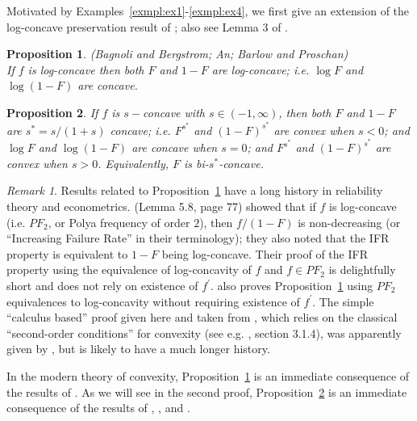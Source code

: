 \documentclass[11pt]{amsart}
\numberwithin{equation}{section}
\theoremstyle{definition}\newtheorem{definition}{Definition}
\theoremstyle{remark}\newtheorem{assumption}{Assumption}
\theoremstyle{remark}\newtheorem{remark}{Remark}
\theoremstyle{definition}\newtheorem{example}{Example}
\theoremstyle{plain}\newtheorem{question}{Question}
\theoremstyle{plain}\newtheorem{theorem}{Theorem}
\theoremstyle{plain}\newtheorem{lemma}{Lemma}
\theoremstyle{plain}\newtheorem{proposition}{Proposition}
\theoremstyle{plain}\newtheorem{corollary}{Corollary}
\theoremstyle{plain}\newtheorem{conjecture}{Conjecture}
\begin{document}
Motivated by Examples~\ref{exmpl:ex1}-\ref{exmpl:ex4}, 
we first give an extension of the log-concave preservation result of 
\cite{MR2213177}; 
also see Lemma 3 of  \cite{MR1637480}.
\smallskip
 
\begin{proposition}
\label{prop:BagnoliBergstrom} 
(Bagnoli and Bergstrom;  An;  Barlow and Proschan)\\
If $f$ is log-concave then both $F$ and $1-F$ are log-concave; i.e. $\log F$ and $\log (1-F)$ 
are concave.
\end{proposition}

\begin{proposition}
\label{prop:1s}  
If $f$ is $s-$concave with $s \in (-1,\infty)$, 
then both $F $ and $1-F$ are $ s^* = s/(1+s)$ concave; 
i.e. $F^{s^*} $ and $(1-F)^{s^*}$ are convex when $s<0$; and $\log F $ and $\log (1-F)$ are concave
when $s=0$; and  $F^{s^*} $ and $(1-F)^{s^*}$ are convex when $s>0$.  Equivalently, $F$ is bi-$s^*$-concave.
\end{proposition}
  
\begin{remark}
\label{rem:1}
Results related to Proposition~\ref{prop:BagnoliBergstrom} have a long history in reliability theory and econometrics.
\cite{MR0438625} (Lemma 5.8, page 77) showed that if $f$ is log-concave (i.e. $PF_2$, or Polya frequency of order $2$), 
then $f/(1-F)$ is non-decreasing (or ``Increasing Failure Rate'' in their terminology);   they also noted that 
the IFR property is equivalent to $1-F$ being log-concave.  Their proof of the IFR property using the equivalence 
of log-concavity of $f$ and $f \in PF_2$ is delightfully short and does not rely on existence of $f^{\prime}$.
\cite{MR1637480} also proves Proposition~\ref{prop:BagnoliBergstrom} using $PF_2$ 
equivalences to log-concavity without requiring existence of $f^{\prime}$.
The simple ``calculus based'' proof given here and taken from  \cite{MR2213177}, which relies on the 
classical ``second-order conditions'' for convexity (see e.g. \cite{MR2061575}, section 3.1.4), 
was apparently given by \cite{Dierker:1991}, but is likely to have a much longer history.
\end{remark}

In the modern theory of convexity, Proposition~\ref{prop:BagnoliBergstrom} is an immediate consequence of 
the results of \cite{MR0404557}.  
As we will see in the second proof,  Proposition~\ref{prop:1s}  is an immediate consequence 
of the results of \cite{MR0404559}, \cite{MR0450480}, and \cite{MR0428540}.  
\smallskip  
\end{document}
